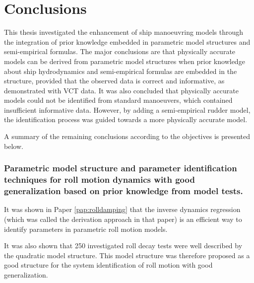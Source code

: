 \chapter{Conclusions\label{ch:conclusions}}

\noindent This thesis investigated the enhancement of ship manoeuvring models through the integration of prior knowledge embedded in parametric model structures and semi-empirical formulas. The major conclusions are that physically accurate models can be derived from parametric model structures when prior knowledge about ship hydrodynamics and semi-empirical formulas are embedded in the structure, provided that the observed data is correct and informative, as demonstrated with VCT data. It was also concluded that physically accurate models could not be identified from standard manoeuvers, which contained insufficient informative data. However, by adding a semi-empirical rudder model, the identification process was guided towards a more physically accurate model.

A summary of the remaining conclusions according to the objectives is presented below.

\subsection*{Parametric model structure and parameter identification techniques for roll motion dynamics with good generalization based on prior knowledge from model tests.}
It was shown in Paper \ref{pap:rolldamping} that the inverse dynamics regression (which was called the derivation approach in that paper) is an efficient way to identify parameters in parametric roll motion models. 

It was also shown that 250 investigated roll decay tests were well described by the quadratic model structure. This model structure was therefore proposed as a good structure for the system identification of roll motion with good generalization.  

